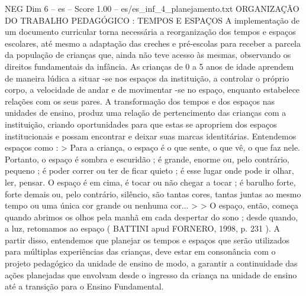 \begin{textsample}{NEG Dim 6 – es – Score 1.00 – es/es\_inf\_4\_planejamento.txt}
ORGANIZAÇÃO DO TRABALHO PEDAGÓGICO : TEMPOS E ESPAÇOS A implementação de um documento curricular torna necessária a reorganização dos tempos e espaços escolares, até mesmo a adaptação das creches e pré-escolas para receber a parcela da população de crianças que, ainda não teve acesso às mesmas, observando os direitos fundamentais da infância.
As crianças de 0 a 5 anos de idade aprendem de maneira lúdica a situar -se nos espaços da instituição, a controlar o próprio corpo, a velocidade de andar e de movimentar -se no espaço, enquanto estabelece relações com os seus pares.
A transformação dos tempos e dos espaços nas unidades de ensino, produz uma relação de pertencimento das crianças com a instituição, criando oportunidades para que estas se apropriem dos espaços institucionais e possam encontrar e deixar suas marcas identitárias.
Entendemos espaços como : > Para a criança, o espaço é o que sente, o que vê, o que faz nele.
Portanto, o espaço é sombra e escuridão ; é grande, enorme ou, pelo contrário, pequeno ; é poder correr ou ter de ficar quieto ; é esse lugar onde pode ir olhar, ler, pensar.
O espaço é em cima, é tocar ou não chegar a tocar ; é barulho forte, forte demais ou, pelo contrário, silêncio, são tantas cores, tantas juntas ao mesmo tempo ou uma única cor grande ou nenhuma cor... > > O espaço, então, começa quando abrimos os olhos pela manhã em cada despertar do sono ; desde quando, a luz, retomamos ao espaço ( BATTINI apud FORNERO, 1998, p. 231 ).
A partir disso, entendemos que planejar os tempos e espaços que serão utilizados para múltiplas experiências das crianças, deve estar em consonância com o projeto pedagógico da unidade de ensino de modo, a garantir a continuidade das ações planejadas que envolvam desde o ingresso da criança na unidade de ensino até a transição para o Ensino Fundamental.

\end{textsample}
